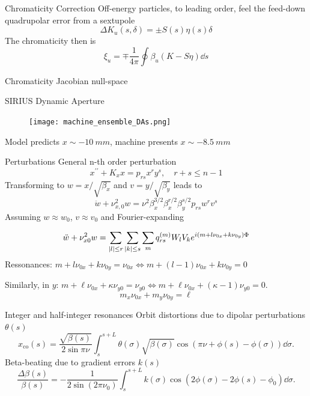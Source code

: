 \documentclass[aspectratio=169]{beamer}
\begin{document}
\begin{frame}{Chromaticity Correction}
    Off-energy particles, to leading order, feel the feed-down quadrupolar error from a sextupole
    $$\Delta K_{u}(s,\delta)=\pm S(s)\eta(s) \delta$$
    The chromaticity then is
    \begin{equation*}
        \xi_{u}=\mp \frac{1}{4\pi}\oint\beta_{u}(K - S\eta)\dd{s}
    \end{equation*}
\end{frame}
\begin{frame}{Chromaticity Jacobian null-space}

\end{frame}
\begin{frame}{SIRIUS Dynamic Aperture}
\begin{figure}
    \centering
    \texttt{[image: machine\_ensemble\_DAs.png]}
\end{figure}
\pause
Model predicts $x\sim-10~\unit{mm}$, machine presents $x\sim-8.5~\unit{mm}$
\end{frame}
\begin{frame}{Perturbations}
    General n-th order perturbation
    $$x^{\prime\prime}+K_{x}x = p_{rs}x^{r}y^{s}, \quad r+s\leq n-1$$
    \pause
    Transforming  to $w = x / \sqrt{\beta_x}$ and $v = y / \sqrt{\beta_y}$ leads to
        $$\ddot{w}+\nu_{x,0}^{2}w=\nu^{2}\beta_{x}^{3/2}\beta_{x}^{r/2}\beta_{y}^{s/2}p_{rs}w^{r}v^{s}$$
    \pause
    Assuming $w\approx w_0$, $v\approx v_0$ and Fourier-expanding \pause

    $$\ddot{w}+\nu_{x0}^{2}w=\sum_{\abs{l}\leq r}\sum_{\abs{k}\leq s}\sum_{m} q_{rs}^{(m)}W_{l}V_{k}e^{i(m+l\nu_{0x}+k\nu_{0y})\Phi}$$
    \pause
    Ressonances: $m+l\nu_{0x}+k\nu_{0y} = \nu_{0x} \iff m+(l-1)\nu_{0x}+k\nu_{0y}=0$\\
    \pause

    Similarly, in $y$: $m+\ell\nu_{0x}+\kappa\nu_{y0}=\nu_{y0} \iff m+\ell\nu_{0x}+(\kappa-1)\nu_{y0}=0$.
    $$m_x\nu_{0x}+m_y\nu_{0y}=\ell$$
\end{frame}
\begin{frame}{Integer and half-integer resonances}
    Orbit distortions due to dipolar perturbations $\theta(s)$
\begin{equation*}
    x_{\text{co}}(s) = \frac{\sqrt{\beta(s)}}{2\sin\pi\nu}\int_{s}^{s+L} \theta(\sigma)\sqrt{\beta(\sigma)}\cos(\pi\nu + \phi(s) - \phi(\sigma))\dd \sigma.
\end{equation*}
    Beta-beating due to gradient errors $k(s)$
 \begin{equation*}
    \frac{\Delta \beta(s)}{\beta(s)} = - \frac{1}{2\sin(2\pi\nu_0)}\int_{s}^{s+L}k(\sigma)\cos(2\phi(\sigma)-2\phi(s)-\phi_0)\dd\sigma.
 \end{equation*}
\end{frame}{}
\end{document}

